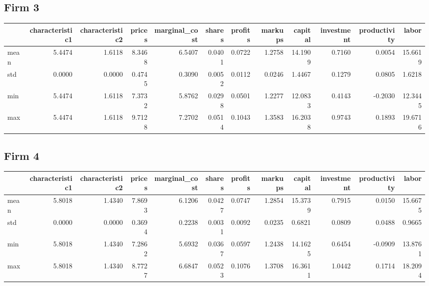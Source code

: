 \subsection*{Firm 3}
\begin{tabular}{lrrrrrrrrrrr}
\toprule
{} &  characteristic1 &  characteristic2 &  prices &  marginal\_cost &  shares &  profits &  markups &  capital &  investment &  productivity &   labor \\
\midrule
mean &           5.4474 &           1.6118 &  8.3468 &         6.5407 &  0.0401 &   0.0722 &   1.2758 &  14.1909 &      0.7160 &        0.0054 & 15.6619 \\
std  &           0.0000 &           0.0000 &  0.4745 &         0.3090 &  0.0052 &   0.0112 &   0.0246 &   1.4467 &      0.1279 &        0.0805 &  1.6218 \\
min  &           5.4474 &           1.6118 &  7.3732 &         5.8762 &  0.0298 &   0.0501 &   1.2277 &  12.0833 &      0.4143 &       -0.2030 & 12.3445 \\
max  &           5.4474 &           1.6118 &  9.7128 &         7.2702 &  0.0514 &   0.1043 &   1.3583 &  16.2038 &      0.9743 &        0.1893 & 19.6716 \\
\bottomrule
\end{tabular}


\subsection*{Firm 4}
\begin{tabular}{lrrrrrrrrrrr}
\toprule
{} &  characteristic1 &  characteristic2 &  prices &  marginal\_cost &  shares &  profits &  markups &  capital &  investment &  productivity &   labor \\
\midrule
mean &           5.8018 &           1.4340 &  7.8693 &         6.1206 &  0.0427 &   0.0747 &   1.2854 &  15.3739 &      0.7915 &        0.0150 & 15.6675 \\
std  &           0.0000 &           0.0000 &  0.3694 &         0.2238 &  0.0031 &   0.0092 &   0.0235 &   0.6821 &      0.0809 &        0.0488 &  0.9665 \\
min  &           5.8018 &           1.4340 &  7.2862 &         5.6932 &  0.0367 &   0.0597 &   1.2438 &  14.1625 &      0.6454 &       -0.0909 & 13.8761 \\
max  &           5.8018 &           1.4340 &  8.7727 &         6.6847 &  0.0523 &   0.1076 &   1.3708 &  16.3611 &      1.0442 &        0.1714 & 18.2094 \\
\bottomrule
\end{tabular}


